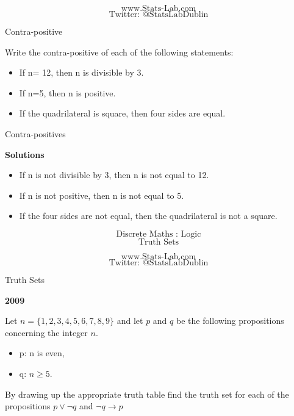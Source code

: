 \documentclass[12pt]{article}
\begin{document}
\[\mbox{www.Stats-Lab.com}\]
\[\mbox{Twitter: @StatsLabDublin}\]




{Contra-positive}

Write the contra-positive of each of the following statements:

\begin{itemize}
\item If n= 12, then n is divisible by 3.
\item If n=5, then n is positive.
\item If the quadrilateral is square, then four sides are equal.
\end{itemize}


{Contra-positives}

\textbf{Solutions}
\begin{itemize}
\item If n is not divisible by 3, then n is not equal to 12.
\item If n is not positive, then n is not equal to 5.
\item If the four sides are not equal, then the quadrilateral is not a square.
\end{itemize}




\[\mbox{Discrete Maths :  Logic}\]
\[\mbox{Truth Sets}\]
\bigskip

\[\mbox{www.Stats-Lab.com}\]
\[\mbox{Twitter: @StatsLabDublin}\]




{Truth Sets}


\textbf{2009} 

Let $n = \{1, 2,3,4, 5,6,7, 8, 9\}$ and let $p$ and  $q$ be the following propositions concerning the integer $n$.
\begin{itemize}
\item p: n is even, 
\item q: $n\geq 5$.
\end{itemize}
By drawing up the appropriate truth table ﬁnd the truth set for each of the
propositions $p \vee \neg q$ and $ \neg q \rightarrow p$
\end{document}
